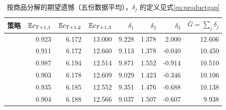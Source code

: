\begin{table}[htbp]
\centering\small
\caption{按商品分解的期望遗憾（五份数据平均），$\delta_j$ 的定义见式\eqref{eq:productgap}}\label{tab:product}
\begin{tabular}{lrrrrrrr}
\toprule
策略 & $\mathbb E c_{T+1,1}$ & $\mathbb E c_{T+1,2}$ & $\mathbb E c_{T+1,3}$ & $\delta_1$ & $\delta_2$ & $\delta_3$ & $\overline G=\sum_j\delta_j$ \\
\midrule
\AlgOne{} & 0.923 & 6.172 & 13.000 & 9.228 & 1.378 & 2.000 & 12.606 \\
\Greedy{} & 0.911 & 6.172 & 12.660 & 9.113 & 1.378 & -0.040 & 10.450 \\
\LPFD{} & 0.987 & 6.194 & 12.514 & 9.871 & 1.552 & -0.914 & 10.510 \\
\LPDual{} & 0.903 & 6.178 & 12.609 & 9.029 & 1.423 & -0.346 & 10.106 \\
\IIDDP{} & 0.935 & 6.185 & 12.552 & 9.351 & 1.476 & -0.688 & 10.138 \\
\SeqDP{} & 0.904 & 6.188 & 12.566 & 9.037 & 1.507 & -0.607 & 9.938 \\
\bottomrule
\end{tabular}
\end{table}
